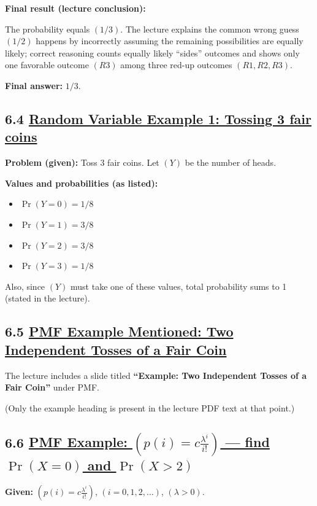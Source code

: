 \documentclass[11pt]{article}
\begin{document}
\textbf{Final result (lecture conclusion):}

The probability equals $(1/3)$. The lecture explains the common wrong guess $(1/2)$ happens by incorrectly assuming the remaining possibilities are equally likely; correct reasoning counts equally likely “sides” outcomes and shows only one favorable outcome $(R3)$ among three red-up outcomes $(R1, R2, R3)$.

\textbf{Final answer:} $\boxed{1/3}$.

\vspace{0.5cm}
\subsection*{6.4 \underline{Random Variable Example 1: Tossing 3 fair coins}}

\textbf{Problem (given):} Toss 3 fair coins. Let $(Y)$ be the number of heads.

\textbf{Values and probabilities (as listed):}
\begin{itemize}
\item $\Pr(Y=0)=1/8$
\item $\Pr(Y=1)=3/8$
\item $\Pr(Y=2)=3/8$
\item $\Pr(Y=3)=1/8$
\end{itemize}

Also, since $(Y)$ must take one of these values, total probability sums to 1 (stated in the lecture).

\vspace{0.5cm}
\subsection*{6.5 \underline{PMF Example Mentioned: Two Independent Tosses of a Fair Coin}}

The lecture includes a slide titled \textbf{“Example: Two Independent Tosses of a Fair Coin”} under PMF.

(Only the example heading is present in the lecture PDF text at that point.)

\vspace{0.5cm}
\subsection*{6.6 \underline{PMF Example: $\left(p(i)=c\frac{\lambda^i}{i!}\right)$ — find $\Pr(X=0)$ and $\Pr(X>2)$}}

\textbf{Given:} $\left(p(i)=c\frac{\lambda^i}{i!}\right)$, $(i=0,1,2,\dots)$, $(\lambda>0)$.
\end{document}
